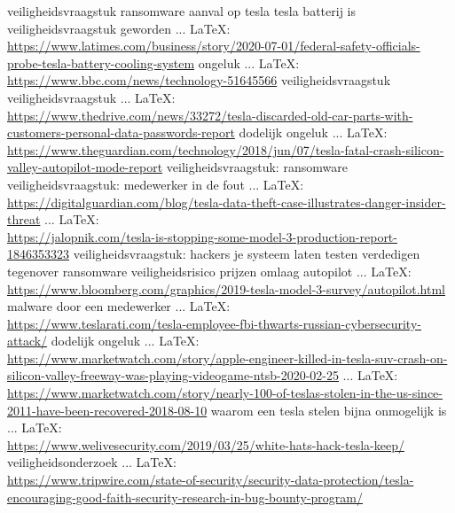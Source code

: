 \begin{thebibliography}{99}
veiligheidsvraagstuk
ransomware aanval op tesla
tesla batterij is veiligheidsvraagstuk geworden
 ... \LaTeX:\\ \url{https://www.latimes.com/business/story/2020-07-01/federal-safety-officials-probe-tesla-battery-cooling-system}
ongeluk
 ... \LaTeX:\\ \url{https://www.bbc.com/news/technology-51645566}
veiligheidsvraagstuk
veiligheidsvraagstuk
 ... \LaTeX:\\ \url{https://www.thedrive.com/news/33272/tesla-discarded-old-car-parts-with-customers-personal-data-passwords-report}
dodelijk ongeluk
 ... \LaTeX:\\ \url{https://www.theguardian.com/technology/2018/jun/07/tesla-fatal-crash-silicon-valley-autopilot-mode-report}
veiligheidsvraagstuk: ransomware
veiligheidsvraagstuk: medewerker in de fout
 ... \LaTeX:\\ \url{https://digitalguardian.com/blog/tesla-data-theft-case-illustrates-danger-insider-threat}
 ... \LaTeX:\\ \url{https://jalopnik.com/tesla-is-stopping-some-model-3-production-report-1846353323}
veiligheidsvraagstuk: hackers je systeem laten testen
verdedigen tegenover ransomware
veiligheidsrisico
prijzen omlaag
autopilot
 ... \LaTeX:\\ \url{https://www.bloomberg.com/graphics/2019-tesla-model-3-survey/autopilot.html}
malware door een medewerker
 ... \LaTeX:\\ \url{https://www.teslarati.com/tesla-employee-fbi-thwarts-russian-cybersecurity-attack/}
dodelijk ongeluk
 ... \LaTeX:\\ \url{https://www.marketwatch.com/story/apple-engineer-killed-in-tesla-suv-crash-on-silicon-valley-freeway-was-playing-videogame-ntsb-2020-02-25}
 ... \LaTeX:\\ \url{https://www.marketwatch.com/story/nearly-100-of-teslas-stolen-in-the-us-since-2011-have-been-recovered-2018-08-10}
waarom een tesla stelen bijna onmogelijk is
 ... \LaTeX:\\ \url{https://www.welivesecurity.com/2019/03/25/white-hats-hack-tesla-keep/}
veiligheidsonderzoek
 ... \LaTeX:\\ \url{https://www.tripwire.com/state-of-security/security-data-protection/tesla-encouraging-good-faith-security-research-in-bug-bounty-program/}

\end{thebibliography}
